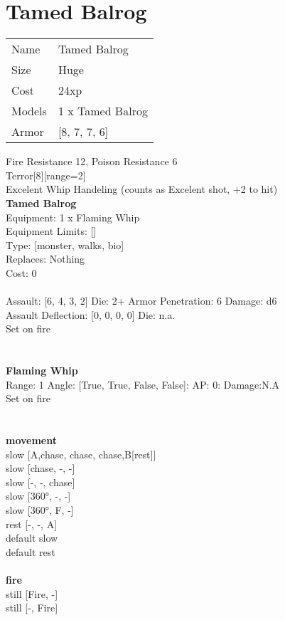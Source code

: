 \pagebreak

\section{ Tamed Balrog }

\begin{tabular}{ll}
  Name & Tamed Balrog \\
  Size & Huge\\
  Cost & 24xp\\
  Models & 1 x Tamed Balrog\\
  Armor & [8, 7, 7, 6]\\
\end{tabular}

\noindent Fire Resistance 12, Poison Resistance 6\\ 
Terror[8][range=2]\\ 
Excelent Whip Handeling (counts as Excelent shot, +2 to hit)\\ 


{\bf Tamed Balrog } \\
Equipment: 1 x Flaming Whip \\
Equipment Limits: [] \\
Type: [monster, walks, bio] \\
Replaces: Nothing \\
Cost: 0\\
\ \\
Assault: [6, 4, 3, 2] Die: 2+ Armor Penetration: 6 Damage: d6 \\
Assault Deflection: [0, 0, 0, 0] Die: n.a.\\
\indent Set on fire\\ 
 
\ \\

\ \\
{\bf Flaming Whip } \\



Range: 1  Angle: [True, True, False, False]: AP: 0: Damage:N.A \\
Set on fire\\ 




 
\ \\



\ \\ {\bf movement } \\
slow [A,chase, chase, chase,B[rest]] \\
slow [chase, -, -] \\
slow [-, -, chase] \\
slow [360°, -, -] \\
slow [360°, F, -] \\
rest [-, -, A] \\
default slow \\
default rest \\
\ \\ {\bf fire } \\
still [Fire, -] \\
still [-, Fire] \\


